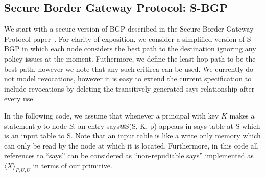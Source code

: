 \subsection{Secure Border Gateway Protocol: S-BGP}
We start with a secure version of BGP described in the Secure Border Gateway Protocol paper~\cite{secure-bgp}. 
For clarity of exposition, we consider a simplified version of S-BGP in which each node considers the best 
path to the destination ignoring any policy issues at the moment. Futhermore, we define the least hop path to 
be the best path, however we note that any such critirea can be used. We currently do not model revocations, however 
it is easy to extend the current specification to include revocations by deleting the transitively generated 
says relationship after every use.

In the following code, we assume that whenever a principal with key $K$ makes a statement $p$ to node $S$,
an entry says@S(S, K, p) appears in says table at S which is an input table to S. Note that an input table is like 
a write only memory which can only be read by the node at which it is located. Furthermore, in this code all 
references to ``says'' can be considered as ``non-repudiable says'' implemented as $\langle X \rangle_{P,U,U}$ 
in terms of our primitive.

